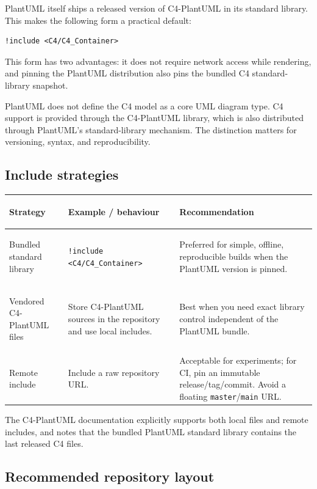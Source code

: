 \documentclass[11pt]{article}
\newcommand{\code}[1]{\texttt{#1}}
\begin{document}
PlantUML itself ships a released version of C4-PlantUML in its standard library. This makes the following form a practical default:\cite{plantumlstdlib,c4plantuml}

\begin{lstlisting}[language=PlantUML]
!include <C4/C4_Container>
\end{lstlisting}

This form has two advantages: it does not require network access while rendering, and pinning the PlantUML distribution also pins the bundled C4 standard-library snapshot.

\begin{warningbox}
PlantUML does not define the C4 model as a core UML diagram type. C4 support is provided through the C4-PlantUML library, which is also distributed through PlantUML's standard-library mechanism. The distinction matters for versioning, syntax, and reproducibility.\cite{plantumlstdlib,c4plantuml}
\end{warningbox}

\subsection{Include strategies}

\begin{tabularx}{\textwidth}{>{\bfseries\raggedright\arraybackslash}p{} X X}
\toprule
Strategy & Example / behaviour & Recommendation \\
\midrule
Bundled standard library & \code{!include <C4/C4\_Container>} & Preferred for simple, offline, reproducible builds when the PlantUML version is pinned. \\
Vendored C4-PlantUML files & Store C4-PlantUML sources in the repository and use local includes. & Best when you need exact library control independent of the PlantUML bundle. \\
Remote include & Include a raw repository URL. & Acceptable for experiments; for CI, pin an immutable release/tag/commit. Avoid a floating \code{master}/\code{main} URL. \\
\bottomrule
\end{tabularx}

The C4-PlantUML documentation explicitly supports both local files and remote includes, and notes that the bundled PlantUML standard library contains the last released C4 files.\cite{c4plantuml}

\subsection{Recommended repository layout}
\end{document}
